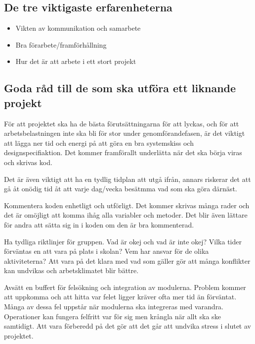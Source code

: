 \documentclass[11pt]{article}
\begin{document}
\subsection{De tre viktigaste erfarenheterna}
\begin{itemize}
\item Vikten av kommunikation och samarbete
\item Bra förarbete/framförhållning
\item Hur det är att arbete i ett stort projekt
\end{itemize} 

\subsection{Goda råd till de som ska utföra ett liknande projekt}
För att projektet ska ha de bästa förutsättningarna för att lyckas, och för att arbetsbelastningen inte ska bli för stor under genomförandefasen, är det viktigt att lägga ner tid och energi på att göra en bra systemskiss och designspecifiaktion. Det kommer framförallt underlätta när det ska börja viras och skrivas kod. 

Det är även viktigt att ha en tydlig tidplan att utgå ifrån, annars riskerar det att gå åt onödig tid åt att varje dag/vecka besätmma vad som ska göra därnäst.

Kommentera koden enhetligt och utförligt. Det kommer skrivas många rader och det är omöjligt att komma ihåg alla variabler och metoder. Det blir även lättare för andra att sätta sig in i koden om den är bra kommenterad. 

Ha tydliga riktlinjer för gruppen. Vad är okej och vad är inte okej? Vilka tider förväntas en att vara på plats i skolan? Vem har ansvar för de olika aktiviteterna? Att vara på det klara med vad som gäller gör att många konflikter kan undvikas och arbetsklimatet blir bättre.

Avsätt en buffert för felsökning och integration av modulerna. Problem kommer att uppkomma och att hitta var felet ligger kräver ofta mer tid än förväntat. Många av dessa fel uppstår när modulerna ska integreras med varandra. Operationer kan fungera felfritt var för sig men krångla när allt ska ske samtidigt. Att vara förberedd på det gör att det går att undvika stress i slutet av projektet. 
\end{document}
